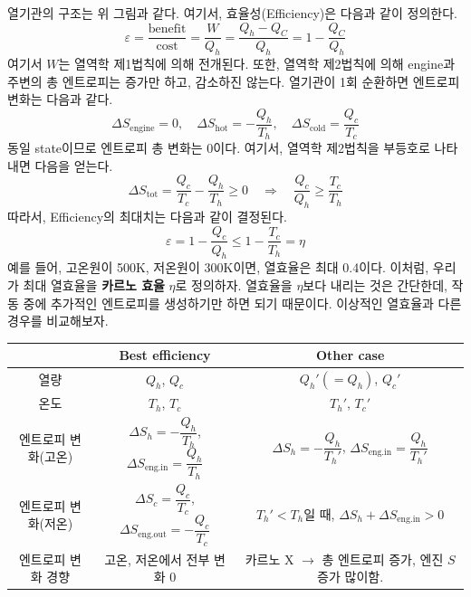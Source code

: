 \documentclass{article}
\newcommand{\ve}{\varepsilon}
\begin{document}
\noindent
열기관의 구조는 위 그림과 같다. 여기서, 효율성(Efficiency)은 다음과 같이 정의한다.
\begin{equation}
    \ve = \frac{\text{benefit}}{\text{cost}} = \frac{W}{Q_h} = \frac{Q_h - Q_C}{Q_h} = 1 - \frac{Q_C}{Q_h}
\end{equation}
여기서 $W$는 열역학 제1법칙에 의해 전개된다. 또한, 열역학 제2법칙에 의해 engine과 주변의 총 엔트로피는 증가만 하고, 감소하진 않는다. 열기관이 1회 순환하면 엔트로피 변화는 다음과 같다. 
\begin{equation}
    \Delta S_{\text{engine}} = 0, \quad \Delta S_{\text{hot}} = -\frac{Q_h}{T_h}, \quad \Delta S_{\text{cold}} = \frac{Q_c}{T_c}
\end{equation}
동일 state이므로 엔트로피 총 변화는 0이다. 여기서, 열역학 제2법칙을 부등호로 나타내면 다음을 얻는다.
\begin{equation}
    \Delta S_{\text{tot}} = \frac{Q_c}{T_c} - \frac{Q_h}{T_h} \geq 0 \quad \Rightarrow \quad \frac{Q_c}{Q_h} \geq \frac{T_c}{T_h}
\end{equation}
따라서, Efficiency의 최대치는 다음과 같이 결정된다.
\begin{equation}
    \ve = 1-\frac{Q_c}{Q_h} \leq 1-\frac{T_c}{T_h} = \eta
\end{equation}
예를 들어, 고온원이 500K, 저온원이 300K이면, 열효율은 최대 0.4이다. 이처럼, 우리가 최대 열효율을 \textbf{카르노 효율} $\eta$로 정의하자. 열효율을 $\eta$보다 내리는 것은 간단한데, 작동 중에 추가적인 엔트로피를 생성하기만 하면 되기 때문이다. 이상적인 열효율과 다른 경우를 비교해보자. 

\begin{table}[h] \centering
\begin{tabular}{@{}ccc@{}}
\toprule
           & Best efficiency  & Other case                                                      \\ \midrule
열량         & $Q_h$, $Q_c$     & $Q_h ' (= Q_h)$, $Q_c '$                                          \\
온도         & $T_h$, $T_c$     & $T_h ' $, $T_c ' $                                              \\
엔트로피 변화(고온) &
  $\Delta S_h = -\dfrac{Q_h}{T_h}$, $\Delta S_\text{eng.in} = \dfrac{Q_h}{T_h}$ &
  $\Delta S_h = -\dfrac{Q_h}{T_h '}$, $\Delta S_\text{eng.in} = \dfrac{Q_h}{T_h '}$ \\
엔트로피 변화(저온) &
  $\Delta S_c = \dfrac{Q_c}{T_c}$, $\Delta S_\text{eng.out} = -\dfrac{Q_c}{T_c}$ &
  $T_h ' < T_h$일 때, $\Delta S_h + \Delta S_\text{eng.in} > 0$ \\
엔트로피 변화 경향 & 고온, 저온에서 전부 변화 0 & 카르노 X $\rightarrow$ 총 엔트로피 증가, 엔진 $S$ 증가 많이함. \\ \bottomrule
\end{tabular}
\end{table}
\end{document}
